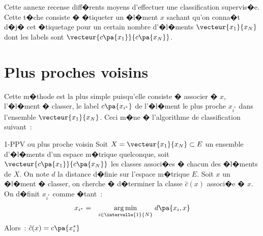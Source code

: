 
\firstpassagedo{}

\firstpassagedo{}


Cette annexe recense diff�rents moyens d'effectuer une classification supervis�e. Cette t�che consiste � �tiqueter un �l�ment $x$ sachant qu'on conna�t d�j� cet �tiquetage pour un certain nombre d'�l�ments $\vecteur{x_1}{x_N}$ dont les labels sont $\vecteur{c\pa{x_1}}{c\pa{x_N}}$.

\label{classification_supervisee}









\section{Plus proches voisins}
\label{clas_super_ppv_par}

Cette m�thode est la plus simple puisqu'elle consiste � associer � $x$, l'�l�ment � classer, le label $c\pa{x_{i^*}}$ de l'�l�ment le plus proche $x_{i^*}$ dans l'ensemble $\vecteur{x_1}{x_N}$. Ceci m�ne � l'algorithme de classification suivant~:


        \begin{xalgorithm}{1-PPV ou plus proche voisin}
        \label{clas_super_1ppv_algo}
        Soit $X = \vecteur{x_1}{x_N} \subset E$ un ensemble d'�l�ments d'un espace m�trique quelconque, 
        soit $\vecteur{c\pa{x_1}}{c\pa{x_N}}$ les classes associ�es � chacun des �l�ments de $X$. On note 
        $d$ la distance d�finie sur l'espace m�trique $E$. Soit $x$
        un �l�ment � classer, on cherche � d�terminer la classe $\hat{c}(x)$ associ�e � $x$. On d�finit $x_{i^*}$ 
        comme �tant~:
                        \begin{eqnarray*}
                        x_{i^*} &=& \underset{i \in \intervalle{1}{N}}{\arg \min} \; d\pa{x_i,x}
                        \end{eqnarray*}
        Alors~: $\hat{c}(x) = c\pa{x_i^*}$
        \end{xalgorithm}


